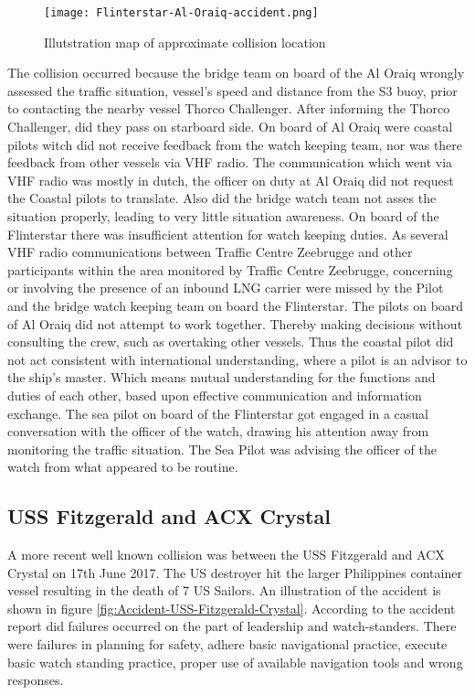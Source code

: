 \begin{figure}[H]
	\centering
	\texttt{[image: Flinterstar-Al-Oraiq-accident.png]}
	\caption{Illutstration map of approximate collision location}
	\label{fig:Accident-Flinterstar-Al-Oraiq}
\end{figure}

The collision occurred because the bridge team on board of the Al Oraiq wrongly assessed the traffic situation, vessel's speed and distance from the S3 buoy, prior to contacting the nearby vessel Thorco Challenger. After informing the Thorco Challenger, did they pass on starboard side. On board of Al Oraiq were coastal pilots witch did not receive feedback from the watch keeping team, nor was there feedback from other vessels via \ac{VHF} radio. The communication which went via VHF radio was mostly in dutch, the officer on duty at Al Oraiq did not request the Coastal pilots to translate. Also did the bridge watch team not asses the situation properly, leading to very little situation awareness.
On board of the Flinterstar there was insufficient attention for watch keeping duties. As several VHF radio communications between Traffic Centre Zeebrugge and other participants within the area monitored by Traffic Centre Zeebrugge, concerning or involving the presence of an inbound LNG carrier were missed by the Pilot and the bridge watch keeping team on board the Flinterstar.
The pilots on board of Al Oraiq did not attempt to work together. Thereby making decisions without consulting the crew, such as overtaking other vessels. Thus the coastal pilot did not act consistent with international understanding, where a pilot is an advisor to the ship's master. Which means mutual understanding for the functions and duties of each other, based upon effective communication and information exchange. 
The sea pilot on board of the Flinterstar got engaged in a casual conversation with the officer of the watch, drawing his attention away from monitoring the traffic situation. The Sea Pilot was advising the officer of the watch from what appeared to be routine. \cite{Backer2015}

\newpage
\subsection{USS Fitzgerald and ACX Crystal}
A more recent well known collision was between the USS Fitzgerald and ACX Crystal on 17th June 2017. The US destroyer hit the larger Philippines container vessel resulting in the death of 7 US Sailors. An illustration of the accident is shown in figure \ref{fig:Accident-USS-Fitzgerald-Crystal}. According to the accident report did failures occurred on the part of leadership and watch-standers. There were failures in planning for safety, adhere basic navigational practice, execute basic watch standing practice, proper use of available navigation tools and wrong responses.

